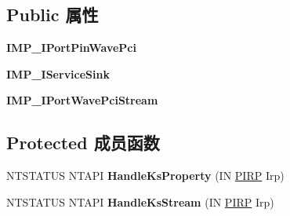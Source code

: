 \subsection*{Public 属性}
\begin{DoxyCompactItemize}
\item 
\mbox{\label{class_c_port_pin_wave_pci_aeceb8a5dd0e8bd4a3e9818b074a62b54}} 
{\bfseries I\+M\+P\+\_\+\+I\+Port\+Pin\+Wave\+Pci}
\item 
\mbox{\label{class_c_port_pin_wave_pci_a258e0a9839b4f2686e539f0d8fced754}} 
{\bfseries I\+M\+P\+\_\+\+I\+Service\+Sink}
\item 
\mbox{\label{class_c_port_pin_wave_pci_a7c532a24780d3ec693e478fcf4cc875e}} 
{\bfseries I\+M\+P\+\_\+\+I\+Port\+Wave\+Pci\+Stream}
\end{DoxyCompactItemize}
\subsection*{Protected 成员函数}
\begin{DoxyCompactItemize}
\item 
\mbox{\label{class_c_port_pin_wave_pci_aaf4253d46dc95f910ec02bd41d5c717c}} 
N\+T\+S\+T\+A\+T\+US N\+T\+A\+PI {\bfseries Handle\+Ks\+Property} (IN \hyperlink{interfacevoid}{P\+I\+RP} Irp)
\item 
\mbox{\label{class_c_port_pin_wave_pci_a6e7db2103edbf83f4424a84586e71436}} 
N\+T\+S\+T\+A\+T\+US N\+T\+A\+PI {\bfseries Handle\+Ks\+Stream} (IN \hyperlink{interfacevoid}{P\+I\+RP} Irp)
\end{DoxyCompactItemize}
